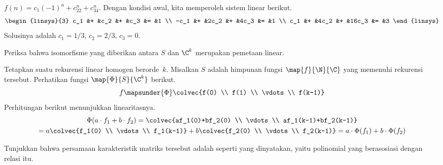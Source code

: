 \begin{exercises}
\begin{answer}
\begin{exparts}
          $f(n)=c_1(-1)^n+c_22^n+c_34^n$.
          Dengan kondisi awal, kita memperoleh sistem linear berikut.
          \begin{equation*}
            \begin{linsys}{3}
              c_1 &+  &c_2   &+  &c_3  &= &1 \\
             -c_1 &+  &2c_2  &+  &4c_3  &= &1 \\
              c_1 &+  &4c_2  &+  &16c_3  &= &3
            \end{linsys}
          \end{equation*}
          Solusinya adalah $c_1=1/3$, $c_2=2/3$, $c_3=0$.
      \end{exparts}
    \end{answer}
  \item \label{exer:SeqToRnLinMap}
    Periksa bahwa isomorfisme yang diberikan antara $S$ dan $\C^k$ merupakan
    pemetaan linear.
    \begin{answer}
      Tetapkan suatu rekurensi linear homogen berorde~$k$.
      Misalkan $S$ adalah himpunan fungsi $\map{f}{\N}{\C}$ yang memenuhi
      rekurensi tersebut.
      Perhatikan fungsi $\map{\Phi}{S}{\C^k}$ berikut.
      \begin{equation*}
        f\mapsunder{\Phi}\colvec{f(0) \\ f(1) \\ \vdots \\ f(k-1)}
      \end{equation*}
      Perhitungan berikut menunjukkan linearitasnya.
      \begin{multline*}
        \Phi(a\cdot f_1+b\cdot f_2)
        =
        \colvec{af_1(0)+bf_2(0) \\ \vdots \\ af_1(k-1)+bf_2(k-1)}     \\
        =
        a\colvec{f_1(0) \\ \vdots \\ f_1(k-1)}
        +
        b\colvec{f_2(0) \\ \vdots \\ f_2(k-1)}
        =a\cdot \Phi(f_1)+b\cdot \Phi(f_2)
      \end{multline*}
    \end{answer}
  \item \label{exer:CharEqnIsDeter}
    Tunjukkan bahwa persamaan karakteristik matriks tersebut adalah seperti
    yang dinyatakan, yaitu polinomial yang berasosiasi dengan relasi itu.

\end{exercises}
